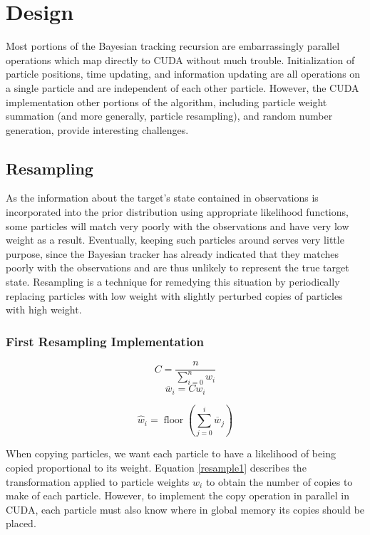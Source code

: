 \documentclass{article}
\begin{document}
\section{Design}
Most portions of the Bayesian tracking recursion are embarrassingly parallel operations which map directly to CUDA without much trouble. Initialization of particle positions, time updating, and information updating are all operations on a single particle and are independent of each other particle. However, the CUDA implementation other portions of the algorithm, including particle weight summation (and more generally, particle resampling), and random number generation, provide interesting challenges.

\subsection{Resampling}\label{Resampling}
As the information about the target's state contained in observations is incorporated into the prior distribution using appropriate likelihood functions, some particles will match very poorly with the observations and have very low weight as a result. Eventually, keeping such particles around serves very little purpose, since the Bayesian tracker has already indicated that they matches poorly with the observations and are thus unlikely to represent the true target state. Resampling is a technique for remedying this situation by periodically replacing particles with low weight with slightly perturbed copies of particles with high weight.

\subsubsection{First Resampling Implementation}

\[ C = \frac{n}{\sum_{i=0}^{n} w_{i}} \]
\begin{equation}\label{resample1}
\overline{w}_{i}=C w_{i}
\end{equation}

\begin{equation}\label{resample2}
\hat{w}_{i}=\operatorname{floor}(\sum_{j=0}^{i} \overline{w}_{j})
\end{equation}

When copying particles, we want each particle to have a likelihood of being copied proportional to its weight. Equation \ref{resample1} describes the transformation applied to particle weights \(w_{i}\) to obtain the number of copies to make of each particle. However, to implement the copy operation in parallel in CUDA, each particle must also know where in global memory its copies should be placed.
\end{document}
